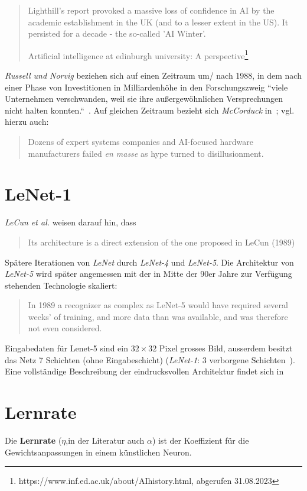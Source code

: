 \blockquote[Artificial intelligence at edinburgh university: A perspective\footnote{https://www.inf.ed.ac.uk/about/AIhistory.html, abgerufen 31.08.2023}]{
    Lighthill's report provoked a massive loss of confidence in AI by the academic establishment in the UK (and to a lesser extent in the US). It persisted for a decade - the so-called 'AI Winter'.
}

\noindent
\textit{Russell und Norvig} beziehen sich auf einen Zeitraum um/ nach 1988, in dem nach einer Phase von Investitionen in Milliardenhöhe in den Forschungszweig ``viele Unternehmen verschwanden, weil sie ihre außergewöhnlichen Versprechungen nicht halten konnten.``~\cite[48]{RN09}. Auf gleichen Zeitraum bezieht sich \textit{McCorduck} in~\cite[432]{Mcc04}; vgl. hierzu auch:

\blockquote[{\cite[656]{Gar19}}]{
    Dozens of expert systems companies and AI-focused hardware manufacturers failed \textit{en masse} as hype turned to disillusionment.
}



\section{LeNet-1}\label{appendix:lenet1}

\textit{LeCun et al.} weisen darauf hin, dass

\blockquote[{\cite[544]{CBD+89}}]{
    Its architecture is a direct extension of the one proposed in LeCun (1989)
}
\noindent
Spätere Iterationen von \textit{LeNet} durch \textit{LeNet-4} und \textit{LeNet-5}. Die Architektur von \textit{LeNet-5} wird später angemessen mit der in Mitte der 90er Jahre zur Verfügung stehenden Technologie skaliert:

\blockquote[{\cite[15]{CBBH98}}]{
    In 1989 a recognizer as complex as LeNet-5 would have required several weeks' of training, and more data than was available, and was therefore not even considered.
}
\noindent
Eingabedaten für Lenet-5 sind ein $32 \times 32$ Pixel grosses Bild, ausserdem besitzt das Netz 7 Schichten (ohne Eingabeschicht) (\textit{LeNet-1}: 3 verborgene Schichten~\cite[544]{CBD+89}).
Eine vollständige Beschreibung der eindrucksvollen Architektur findet sich in\cite[7 f.]{CBBH98}

\section{Lernrate}
Die \textbf{Lernrate} ($\eta$,in der Literatur auch $\alpha$) ist der Koeffizient für die Gewichtsanpassungen in einem künstlichen Neuron.

